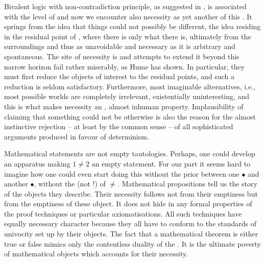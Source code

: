 Bivalent logic with non-contradiction principle, as suggested in
, is associated with the level of  and now we
encounter also necessity as yet another  of this \nexus. It springs
from the idea that things could not possibly be different, the idea residing in
the residual point of , where there is only what there is, ultimately
 from the surroundings and thus as unavoidable and necessary as
it is arbitrary and spontaneous. The site of necessity is  and
attempts to extend it beyond this narrow horizon fail rather miserably, as Hume
has shown. In particular, they must first reduce the objects of
interest to the residual points, and such a reduction is seldom satisfactory.
Furthermore, most imaginable alternatives, i.e., most possible worlds are
completely irrelevant, existentially uninteresting, and this is what makes
necessity an , almost inhuman property.  Implausibility of
claiming that something could not be otherwise is also the reason for the almost
instinctive rejection -- at least by the common sense -- of all sophisticated
arguments produced in favour of determinism.

Mathematical statements are not empty tautologies.  Perhaps,
one could develop an apparatus making $1\not = 2$ an empty statement.  For our
part it seems hard to imagine how one could even start doing this without the
prior  between one $\bullet$ and another $\bullet$, without the
 (not !) of $\not =$.  Mathematical
propositions tell us the story of the objects they describe.  Their necessity
follows not from their emptiness but from the emptiness of these object.  It
does not hide in any formal properties of the proof techniques or particular
axiomatisations.  All such techniques have equally necessary character because
they all have to conform to the standards of  univocity set up by
their objects.  The fact that a mathematical theorem is either true or false
mimics only the contentless duality of the . It is the ultimate poverty of mathematical objects which
accounts for their necessity.


